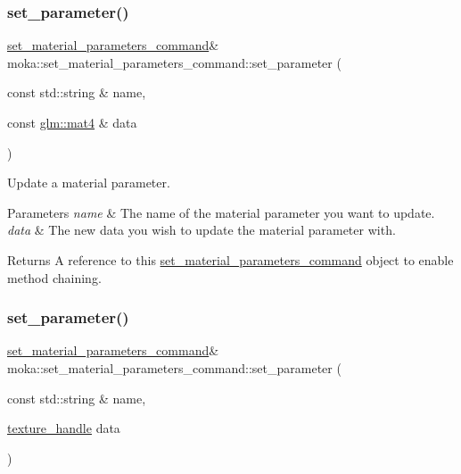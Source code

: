 \subsubsection{\texorpdfstring{set\_parameter()}{set\_parameter()}\hspace{0.1cm}{\footnotesize\ttfamily [5/6]}}
{\footnotesize\ttfamily \mbox{\hyperlink{classmoka_1_1set__material__parameters__command}{set\+\_\+material\+\_\+parameters\+\_\+command}}\& moka\+::set\+\_\+material\+\_\+parameters\+\_\+command\+::set\+\_\+parameter (\begin{DoxyParamCaption}\item[{const std\+::string \&}]{name,  }\item[{const \mbox{\hyperlink{namespacemoka_aed2224bc0e5b79e57a8975ded94ee1aaabe14b41eb96410ea28b32bc138d885ae}{glm\+::mat4}} \&}]{data }\end{DoxyParamCaption})}



Update a material parameter. 


\begin{DoxyParams}{Parameters}
{\em name} & The name of the material parameter you want to update. \\
\hline
{\em data} & The new data you wish to update the material parameter with. \\
\hline
\end{DoxyParams}
\begin{DoxyReturn}{Returns}
A reference to this \mbox{\hyperlink{classmoka_1_1set__material__parameters__command}{set\+\_\+material\+\_\+parameters\+\_\+command}} object to enable method chaining. 
\end{DoxyReturn}
\mbox{\label{classmoka_1_1set__material__parameters__command_af665ea4f3250ac00cd3e6ec965f198bb}} 
\subsubsection{\texorpdfstring{set\_parameter()}{set\_parameter()}\hspace{0.1cm}{\footnotesize\ttfamily [6/6]}}
{\footnotesize\ttfamily \mbox{\hyperlink{classmoka_1_1set__material__parameters__command}{set\+\_\+material\+\_\+parameters\+\_\+command}}\& moka\+::set\+\_\+material\+\_\+parameters\+\_\+command\+::set\+\_\+parameter (\begin{DoxyParamCaption}\item[{const std\+::string \&}]{name,  }\item[{\mbox{\hyperlink{structmoka_1_1texture__handle}{texture\+\_\+handle}}}]{data }\end{DoxyParamCaption})}



